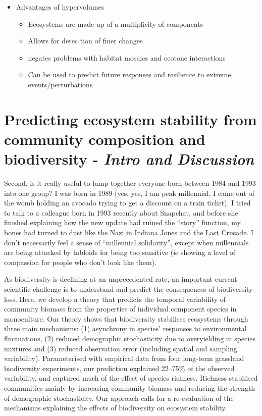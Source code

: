 \documentclass[11pt]{article}
\begin{document}
\begin{itemize}
		\item Advantages of hypervolumes
		\begin{itemize}
			\item Ecosystems are made up of a multiplicity of components
			\item Allows for detec tion of finer changes
			\item negates problems with habitat mosaics and ecotone interactions
			\item Can be used to predict future responses and resilience to extreme events/perturbations
		\end{itemize}
	\end{itemize}
	
	\section*{Predicting ecosystem stability from community composition and biodiversity \citep{DeMazancourt2013} - \textit{Intro and Discussion}}
	Second, is it really useful to lump together everyone born between 1984 and 1993 into one group? I was born in 1989 (yes, yes, I am peak millennial, I came out of the womb holding an avocado trying to get a discount on a train ticket). I tried to talk to a colleague born in 1993 recently about Snapchat, and before she finished explaining how the new update had ruined the “story” function, my bones had turned to dust like the Nazi in Indiana Jones and the Last Crusade. I don’t necessarily feel a sense of “millennial solidarity”, except when millennials are being attacked by tabloids for being too sensitive (ie showing a level of compassion for people who don’t look like them).
	
	
	As biodiversity is declining at an unprecedented rate, an important current scientific challenge is to understand and predict the consequences of biodiversity loss. Here, we develop a theory that predicts the temporal variability of community biomass from the properties of individual component species in monoculture. Our theory shows that biodiversity stabilises ecosystems through three main mechanisms: (1) asynchrony in species’ responses to environmental fluctuations, (2) reduced demographic stochasticity due to overyielding in species mixtures and (3) reduced observation error (including spatial and sampling variability). Parameterised with empirical data from four long-term grassland biodiversity experiments, our prediction explained 22–75\% of the observed variability, and captured much of the effect of species richness. Richness stabilised communities mainly by increasing community biomass and reducing the strength of demographic stochasticity. Our approach calls for a re-evaluation of the mechanisms explaining the effects of biodiversity on ecosystem stability.
	
\end{document}
